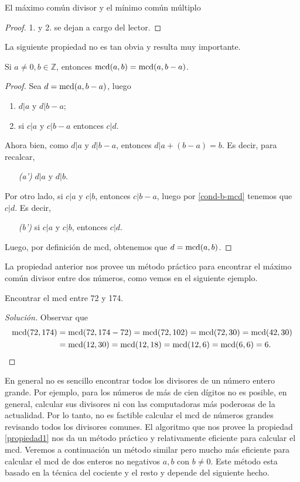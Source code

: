 \begin{section}{El máximo común divisor y el mínimo común múltiplo}
\begin{proof}
    1. y 2.  se dejan a cargo del lector. 
\end{proof}

La siguiente propiedad no es tan obvia y resulta muy importante. 

\begin{propiedad}\label{propiedad1}
    Si $a \not=0, b \in \mathbb Z$, entonces $\operatorname{mcd}(a,b) = \operatorname{mcd}(a,b-a)$. 
\end{propiedad}
\begin{proof}
    Sea $d =  \operatorname{mcd}(a,b-a)$, luego 
    \begin{enumerate}[label=\textit{\alph*)}]
        \item $ d|a$ y $d|b -a$;
        \item\label{cond-b-mcd} si $ c|a $ y $c|b -a$ entonces $ c|d$.
    \end{enumerate}
    Ahora bien, como  $ d|a$ y $d|b -a$, entonces $  d|a +(b -a) = b$. Es decir, para recalcar,
    \begin{enumerate}
        \item[\textit{(a')}] $ d|a$ y $d|b$.
    \end{enumerate}
    Por otro lado, si  $ c|a $ y $c|b$, entonces  $c|b -a$, luego por \ref{cond-b-mcd} tenemos que $c|d$. Es decir, 
    \begin{enumerate}
        \item[\textit{(b')}]si  $ c|a $ y $c|b$, entonces  $c|d$.
    \end{enumerate}
    Luego, por definición de mcd, obtenemos que $d = \operatorname{mcd}(a,b)$.
\end{proof}

La propiedad anterior nos provee un método práctico para encontrar el máximo común divisor entre dos números, como vemos en el siguiente ejemplo.

\begin{ejemplo*} Encontrar el mcd entre 72 y 174.
    \begin{proof}[Solución] Observar que 
        \begin{align*}
        \operatorname{mcd}(72, 174) &= \operatorname{mcd}(72,174-72) = \operatorname{mcd}(72,102) = \operatorname{mcd}(72,30) =  \operatorname{mcd}(42, 30) \\&= \operatorname{mcd}(12,30) = \operatorname{mcd}(12,18)= \operatorname{mcd}(12,6)= \operatorname{mcd}(6,6) = 6.  
        \end{align*}
    \end{proof}
\end{ejemplo*} 

En  general no es sencillo encontrar todos los divisores de un número entero grande. Por ejemplo, para los  números de más de cien dígitos no es posible,  en general, calcular sus divisores ni con las computadoras más poderosas de la actualidad. Por  lo tanto, no es factible calcular el  mcd de números grandes revisando todos los divisores comunes.  El algoritmo que nos provee la  propiedad \ref{propiedad1} nos da un método práctico y relativamente eficiente para calcular el mcd. Veremos a continuación un método similar pero mucho más eficiente para calcular el mcd de dos enteros no negativos $a,b$ con $b \not=0$. Este método esta basado en la técnica del cociente y el resto y depende del siguiente hecho.


\end{section}
